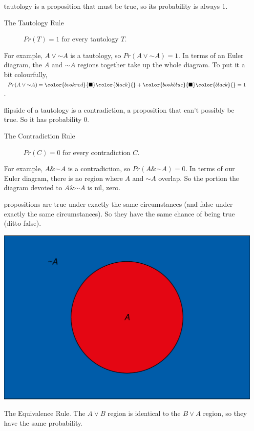 \documentclass[justified]{tufte-book}
\renewcommand{\neg}{\mathbin{\sim}}
\renewcommand{\wedge}{\mathbin{\&}}
\newcommand{\p}{Pr}
\theoremstyle{definition}
\theoremstyle{definition}
\theoremstyle{definition}
\theoremstyle{remark}
\begin{document}
 tautology is a proposition that must be true, so its
probability is always 1.

\begin{description}
\item[The Tautology Rule]
\(\p(T) = 1\) for every tautology \(T\).
\end{description}

For example, \(A \vee \neg A\) is a tautology, so
\(\p(A \vee \neg A) = 1\). In terms of an Euler diagram, the \(A\) and
\(\neg A\) regions together take up the whole diagram. To put it a bit
colourfully,
\(\p(A \vee \neg A) = \color{bookred}{\blacksquare}\color{black}{} + \color{bookblue}{\blacksquare}\color{black}{} = 1\).

 flipside of a tautology is a contradiction, a
proposition that can't possibly be true. So it has probability 0.

\begin{description}
\item[The Contradiction Rule]
\(\p(C) = 0\) for every contradiction \(C\).
\end{description}

For example, \(A \wedge \neg A\) is a contradiction, so
\(\p(A \wedge \neg A) = 0\). In terms of our Euler diagram, there is no
region where \(A\) and \(\neg A\) overlap. So the portion the diagram
devoted to \(A \wedge \neg A\) is nil, zero.

 propositions are true under exactly the same
circumstances (and false under exactly the same circumstances). So they
have the same chance of being true (ditto false).

\begin{marginfigure}
\includegraphics{_main_files/figure-latex/unnamed-chunk-56-1} \caption[The Equivalence Rule]{The Equivalence Rule. The $A \vee B$ region is identical to the $B \vee A$ region, so they have the same probability.}\label{fig:unnamed-chunk-56}
\end{marginfigure}
\end{document}
